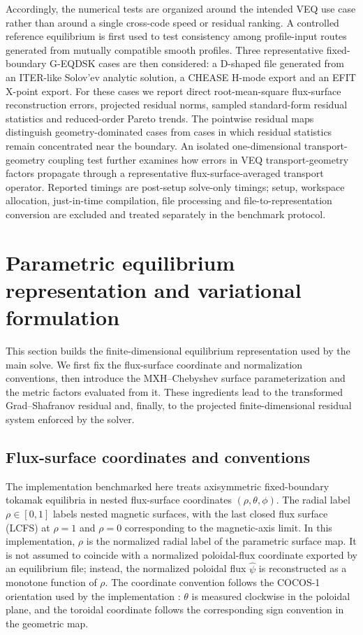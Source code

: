 \documentclass[final, 3p, times]{elsarticle}
\begin{document}
Accordingly, the numerical tests are organized around the intended VEQ use case rather than around a single cross-code speed or residual ranking. A controlled reference equilibrium is first used to test consistency among profile-input routes generated from mutually compatible smooth profiles. Three representative fixed-boundary G-EQDSK cases are then considered: a D-shaped file generated from an ITER-like Solov'ev analytic solution, a CHEASE H-mode export and an EFIT X-point export. For these cases we report direct root-mean-square flux-surface reconstruction errors, projected residual norms, sampled standard-form residual statistics and reduced-order Pareto trends. The pointwise residual maps distinguish geometry-dominated cases from cases in which residual statistics remain concentrated near the boundary. An isolated one-dimensional transport-geometry coupling test further examines how errors in VEQ transport-geometry factors propagate through a representative flux-surface-averaged transport operator. Reported timings are post-setup solve-only timings; setup, workspace allocation, just-in-time compilation, file processing and file-to-representation conversion are excluded and treated separately in the benchmark protocol.

\section{Parametric equilibrium representation and variational formulation}
\label{sec:formulation}

This section builds the finite-dimensional equilibrium representation used by the main solve. We first fix the flux-surface coordinate and normalization conventions, then introduce the MXH--Chebyshev surface parameterization and the metric factors evaluated from it. These ingredients lead to the transformed Grad--Shafranov residual and, finally, to the projected finite-dimensional residual system enforced by the solver.

\subsection{Flux-surface coordinates and conventions}
\label{sec:flux-coords}

The implementation benchmarked here treats axisymmetric fixed-boundary tokamak equilibria in nested flux-surface coordinates $(\rho,\theta,\phi)$. The radial label $\rho\in[0,1]$ labels nested magnetic surfaces, with the last closed flux surface (LCFS) at $\rho=1$ and $\rho=0$ corresponding to the magnetic-axis limit. In this implementation, $\rho$ is the normalized radial label of the parametric surface map. It is not assumed to coincide with a normalized poloidal-flux coordinate exported by an equilibrium file; instead, the normalized poloidal flux $\hat{\psi}$ is reconstructed as a monotone function of $\rho$. The coordinate convention follows the COCOS-1 orientation used by the implementation \cite{Sauter2013}: $\theta$ is measured clockwise in the poloidal plane, and the toroidal coordinate follows the corresponding sign convention in the geometric map.
\end{document}
